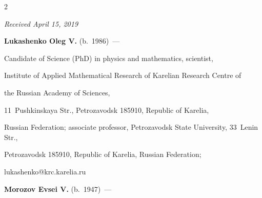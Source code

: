 \begin{multicols}{2}
{{ } }



\end{multicols}



\vspace*{-6pt}



\hfill{\small\textit{Received April 15, 2019}}



\vspace*{-18pt}



\Contr






\noindent

\textbf{Lukashenko Oleg  V.} (b.\ 1986)~--- 

Candidate of Science (PhD) in physics and mathematics, scientist, 

Institute of  Applied Mathematical Research of Karelian Research Centre of 

the Russian Academy of Sciences, 

11~Pushkinskaya Str.,  Petrozavodsk 185910, Republic of Karelia, 

Russian Federation; associate professor, Petrozavodsk State University, 33~Lenin Str., 

Petrozavodsk 185910, Republic of Karelia, Russian Federation; 

\mbox{lukashenko@krc.karelia.ru}



\vspace*{3pt}



\noindent

\textbf{Morozov  Evsei  V.} (b.\ 1947)~--- 

